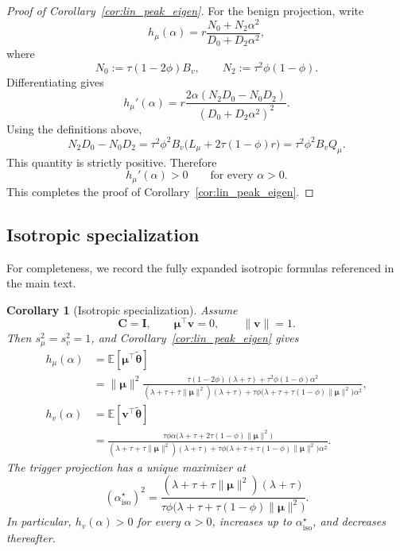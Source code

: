 \documentclass[11pt]{article}
\newcommand{\EE}{\mathbb{E}}
\newcommand{\I}{\mathbf{I}}
\newcommand{\C}{\mathbf{C}}
\newcommand{\bv}{\mathbf{v}}
\newcommand{\bmu}{\boldsymbol{\mu}}
\newcommand{\btheta}{\boldsymbol{\theta}}
\newtheorem{corollary}[theorem]{Corollary}
\begin{document}
\begin{proof}[Proof of Corollary~\ref{cor:lin_peak_eigen}]
For the benign projection, write
\[
h_\mu(\alpha)
=
r\frac{N_0+N_2\alpha^2}{D_0+D_2\alpha^2},
\]
where
\[
N_0:=\tau(1-2\phi)B_v,
\qquad
N_2:=\tau^2\phi(1-\phi).
\]
Differentiating gives
\[
h_\mu'(\alpha)
=
r\frac{2\alpha(N_2D_0-N_0D_2)}
{(D_0+D_2\alpha^2)^2}.
\]
Using the definitions above,
\[
N_2D_0-N_0D_2
=
\tau^2\phi^2B_v
\bigl(L_\mu+2\tau(1-\phi)r\bigr)
=
\tau^2\phi^2B_vQ_\mu.
\]
This quantity is strictly positive. Therefore
\[
h_\mu'(\alpha)>0
\qquad
\text{for every } \alpha>0.
\]
This completes the proof of Corollary~\ref{cor:lin_peak_eigen}.
\end{proof}


\subsection{Isotropic specialization}

For completeness, we record the fully expanded isotropic formulas referenced
in the main text.

\begin{corollary}[Isotropic specialization]
\label{cor:lin_isotropic}
Assume
\[
\C=\I,
\qquad
\bmu^\top\bv=0,
\qquad
\|\bv\|=1.
\]
Then \(s_\mu^2=s_v^2=1\), and Corollary~\ref{cor:lin_peak_eigen} gives
\begin{align}
h_\mu(\alpha)
&=
\EE[\bmu^\top\tilde{\btheta}]
\nonumber\\
&=
\|\bmu\|^2
\frac{
\tau(1-2\phi)(\lambda+\tau)+\tau^2\phi(1-\phi)\alpha^2
}
{
(\lambda+\tau+\tau\|\bmu\|^2)(\lambda+\tau)
+
\tau\phi\bigl(\lambda+\tau+\tau(1-\phi)\|\bmu\|^2\bigr)\alpha^2
},
\label{eq:lin_hmu_iso}
\\[4pt]
h_v(\alpha)
&=
\EE[\bv^\top\tilde{\btheta}]
\nonumber\\
&=
\frac{
\tau\phi\alpha\bigl(\lambda+\tau+2\tau(1-\phi)\|\bmu\|^2\bigr)
}
{
(\lambda+\tau+\tau\|\bmu\|^2)(\lambda+\tau)
+
\tau\phi\bigl(\lambda+\tau+\tau(1-\phi)\|\bmu\|^2\bigr)\alpha^2
}.
\label{eq:lin_hv_iso}
\end{align}
The trigger projection has a unique maximizer at
\begin{equation}
\label{eq:lin_alpha_star_iso}
(\alpha^\star_{\mathrm{iso}})^2
=
\frac{(\lambda+\tau+\tau\|\bmu\|^2)(\lambda+\tau)}
{\tau\phi\bigl(\lambda+\tau+\tau(1-\phi)\|\bmu\|^2\bigr)}.
\end{equation}
In particular, \(h_v(\alpha)>0\) for every \(\alpha>0\), increases up to
\(\alpha^\star_{\mathrm{iso}}\), and decreases thereafter.
\end{corollary}
\end{document}
